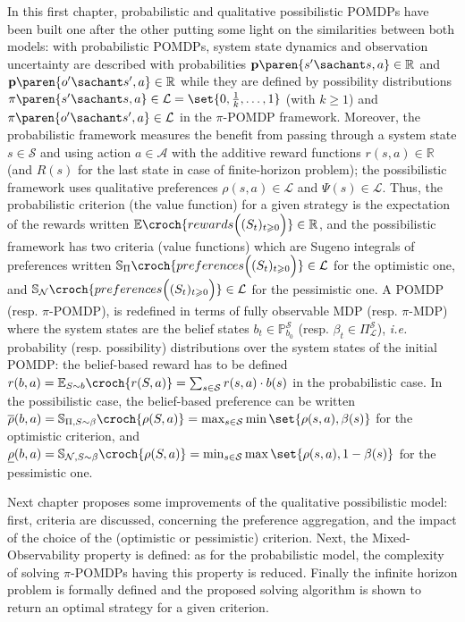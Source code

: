 In this first chapter, probabilistic and qualitative possibilistic POMDPs have been built one after the other
putting some light on the similarities between both models:
with probabilistic POMDPs, system state dynamics and observation uncertainty 
are described with probabilities $\textbf{p} \paren{ s' \sachant s,a } \in \mathbb{R}$
and $\textbf{p} \paren{ o' \sachant s',a } \in \mathbb{R}$
while they are defined by possibility distributions $\pi \paren{ s' \sachant s,a } \in \mathcal{L} = \set{ 0, \frac{1}{k}, \ldots, 1}$ (with $k\geqslant1$) 
and $\pi \paren{ o' \sachant s',a } \in \mathcal{L}$ 
in the $\pi$-POMDP framework.
Moreover, the probabilistic framework measures the benefit from passing through a system state $s \in \mathcal{S}$ and using action $a \in \mathcal{A}$
with the additive reward functions $r(s,a) \in \mathbb{R}$ (and $R(s)$ for the last state in case of finite-horizon problem);
the possibilistic framework uses qualitative preferences $\rho(s,a) \in \mathcal{L}$ and $\Psi(s) \in \mathcal{L}$.
Thus, the probabilistic criterion (the value function) for a given strategy 
is the expectation of the rewards written $\mathbb{E} \croch{ rewards\Big( (S_t)_{t\geqslant0} \Big) } \in \mathbb{R}$, 
and the possibilistic framework has two criteria (value functions) which are Sugeno integrals of preferences written 
$\mathbb{S}_{\Pi} \croch{ preferences\Big( (S_t)_{t\geqslant0} \Big) } \in \mathcal{L}$ for the optimistic one,
and $\mathbb{S}_{\mathcal{N}} \croch{ preferences\Big( (S_t)_{t\geqslant0} \Big) } \in \mathcal{L}$ for the pessimistic one.
A POMDP (resp. $\pi$-POMDP), is redefined in terms of fully observable MDP (resp. $\pi$-MDP)
where the system states are the belief states $b_t \in \mathbb{P}^{\mathcal{S}}_{b_0}$ (resp. $\beta_t \in \Pi^{\mathcal{S}}_{\mathcal{L}}$), 
\textit{i.e.} probability (resp. possibility) distributions over the system states of the initial POMDP:
the belief-based reward has to be defined $r(b,a) = \mathbb{E}_{S \sim b} \croch{ r(S,a) } = \sum_{s \in \mathcal{S}} r(s,a) \cdot b(s)$
in the probabilistic case. In the possibilistic case, the belief-based preference 
can be written $\overline{\rho}(b,a) = \mathbb{S}_{\Pi, S \sim \beta} \croch{ \rho(S,a) } = \max_{s \in \mathcal{S}} \min \set{ \rho(s,a), \beta(s) }$
for the optimistic criterion,
and $\underline{\rho}(b,a) = \mathbb{S}_{\mathcal{N}, S \sim \beta} \croch{ \rho(S,a) } = \min_{s \in \mathcal{S}} \max \set{ \rho(s,a), 1 - \beta(s) }$
for the pessimistic one.

Next chapter proposes some improvements of the qualitative possibilistic model: 
first, criteria are discussed, concerning the preference aggregation, 
and the impact of the choice of the (optimistic or pessimistic) criterion.
Next, the Mixed-Observability property is defined:
as for the probabilistic model,
the complexity of solving $\pi$-POMDPs having this property is reduced.
Finally the infinite horizon problem is formally defined
and the proposed solving algorithm is shown to return an
optimal strategy for a given criterion.
